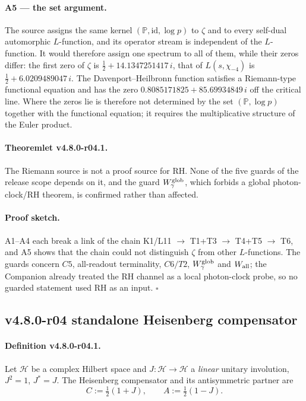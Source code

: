 \paragraph{A5 --- the set argument.}
The source assigns the same kernel \((\mathbb P,\mathrm{id},\log p)\) to \(\zeta\) and to every
self-dual automorphic \(L\)-function, and its operator stream is independent of the
\(L\)-function.  It would therefore assign one spectrum to all of them, while their zeros differ:
the first zero of \(\zeta\) is \(\tfrac12+14.1347251417\,i\), that of \(L(s,\chi_{-4})\) is
\(\tfrac12+6.0209489047\,i\).  The Davenport--Heilbronn function satisfies a Riemann-type
functional equation and has the zero \(0.8085171825+85.69934849\,i\) off the critical line.
Where the zeros lie is therefore not determined by the set \((\mathbb P,\log p)\) together with
the functional equation; it requires the multiplicative structure of the Euler product.

\paragraph{Theoremlet v4.8.0-r04.1.}
The Riemann source is not a proof source for RH.  None of the five guards of the release scope
depends on it, and the guard \(W_\gamma^{\rm glob}\), which forbids a global photon-clock/RH
theorem, is confirmed rather than affected.

\paragraph{Proof sketch.}
A1--A4 each break a link of the chain K1/L11 \(\to\) T1+T3 \(\to\) T4+T5 \(\to\) T6, and A5 shows
that the chain could not distinguish \(\zeta\) from other \(L\)-functions.  The guards concern
\(C5\), all-readout terminality, \(C6/T2\), \(W_\gamma^{\rm glob}\) and \(W_{\rm all}\); the
Companion already treated the RH channel as a local photon-clock probe, so no guarded statement
used RH as an input.  \(\square\)

\subsection*{v4.8.0-r04 standalone Heisenberg compensator}
\label{subsec:v480-r04-standalone-compensator}

\paragraph{Definition v4.8.0-r04.1.}
Let \(\mathcal H\) be a complex Hilbert space and \(J:\mathcal H\to\mathcal H\) a
\emph{linear} unitary involution, \(J^2=1\), \(J^*=J\).  The Heisenberg compensator and its
antisymmetric partner are
\[
C:=\tfrac12(1+J),\qquad A:=\tfrac12(1-J).
\]

